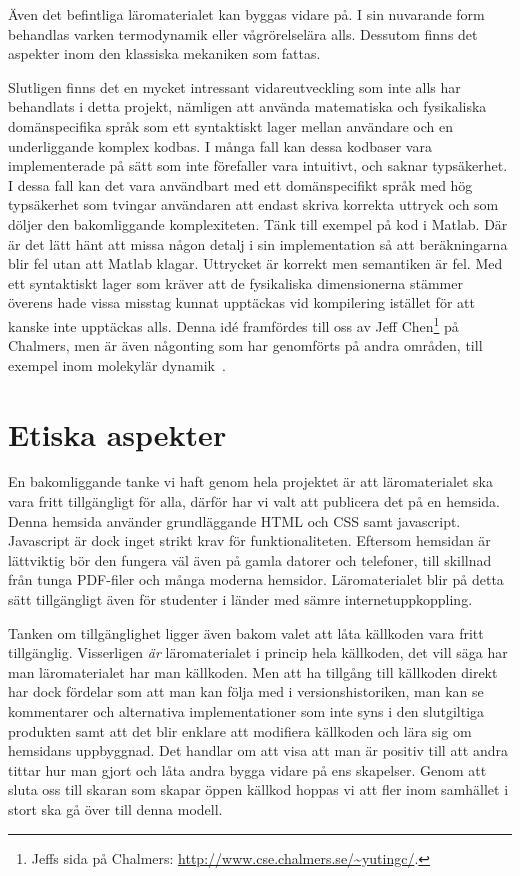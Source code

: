 Även det befintliga läromaterialet kan byggas vidare på. I sin nuvarande
form behandlas varken termodynamik eller vågrörelselära alls. Dessutom
finns det aspekter inom den klassiska mekaniken som fattas.

Slutligen finns det en mycket intressant vidareutveckling som inte alls har
behandlats i detta projekt, nämligen att använda matematiska och fysikaliska domänspecifika språk som
ett syntaktiskt lager mellan användare och en underliggande komplex kodbas. I
många fall kan dessa kodbaser vara implementerade på sätt som inte förefaller vara intuitivt, och saknar
typsäkerhet. I dessa fall kan det vara användbart med ett
domänspecifikt språk med hög typsäkerhet som tvingar användaren att
endast skriva korrekta uttryck och som döljer den bakomliggande komplexiteten. Tänk till exempel på kod i Matlab. Där är det lätt hänt att missa någon detalj i sin implementation så att beräkningarna blir fel utan att Matlab klagar. Uttrycket är korrekt men semantiken är fel. Med ett syntaktiskt lager som kräver att de fysikaliska dimensionerna stämmer överens hade vissa misstag kunnat upptäckas vid kompilering istället för att kanske inte upptäckas alls. Denna idé framfördes till oss av Jeff Chen\footnote{Jeffs sida på Chalmers:
\url{http://www.cse.chalmers.se/\~yutingc/}.}
på Chalmers, men är även någonting som har genomförts på andra områden, till
exempel inom molekylär dynamik~\cite{MD}.

\section{Etiska aspekter}

En bakomliggande tanke vi haft genom hela projektet är att läromaterialet ska
vara fritt tillgängligt för alla, därför har vi valt att publicera det på en
hemsida.  Denna hemsida använder grundläggande HTML och CSS samt javascript.
Javascript är dock inget strikt krav för funktionaliteten. Eftersom hemsidan är
lättviktig bör den fungera väl även på gamla datorer och telefoner, till
skillnad från tunga PDF-filer och många moderna hemsidor. Läromaterialet blir på
detta sätt tillgängligt även för studenter i länder med sämre
internetuppkoppling.

Tanken om tillgänglighet ligger även bakom valet att låta källkoden vara fritt
tillgänglig. Visserligen \textit{är} läromaterialet i princip hela källkoden, det vill säga
har man läromaterialet har man källkoden. Men att ha tillgång till källkoden
direkt har dock fördelar som att man kan följa med i versionshistoriken, man kan
se kommentarer och alternativa implementationer som inte syns i den slutgiltiga
produkten samt att det blir enklare att modifiera källkoden och lära sig om
hemsidans uppbyggnad.  Det handlar om att visa att man är positiv till att andra
tittar hur man gjort och låta andra bygga vidare på ens skapelser. Genom att
sluta oss till skaran som skapar öppen källkod hoppas vi att fler inom samhället
i stort ska gå över till denna modell. 

